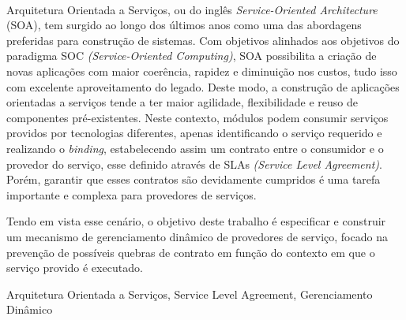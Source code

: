 \paragraph{}
Arquitetura Orientada a Serviços, ou do inglês \textit{Service-Oriented Architecture} (SOA), tem surgido ao longo dos últimos anos como uma das abordagens preferidas para construção de sistemas. Com objetivos alinhados aos objetivos do paradigma SOC \textit{(Service-Oriented Computing)}, SOA possibilita a criação de novas aplicações com maior coerência, rapidez e diminuição nos custos, tudo isso com excelente aproveitamento do legado.
Deste modo, a construção de aplicações orientadas a serviços tende a ter maior agilidade, flexibilidade e reuso de componentes pré-existentes.
Neste contexto, módulos podem consumir serviços providos por tecnologias diferentes, apenas identificando o serviço requerido e realizando o \textit{binding}, estabelecendo assim um contrato entre o consumidor e o provedor do serviço, esse definido através de SLAs \textit{(Service Level Agreement)}. Porém, garantir que esses contratos são devidamente cumpridos é uma tarefa importante e complexa para provedores de serviços.

Tendo em vista esse cenário, o objetivo deste trabalho é especificar e construir um mecanismo de gerenciamento dinâmico de provedores de serviço, focado na prevenção de possíveis quebras de contrato em função do contexto em que o serviço provido é executado.

\begin{keywords}
Arquitetura Orientada a Serviços, Service Level Agreement, Gerenciamento Dinâmico
\end{keywords}
